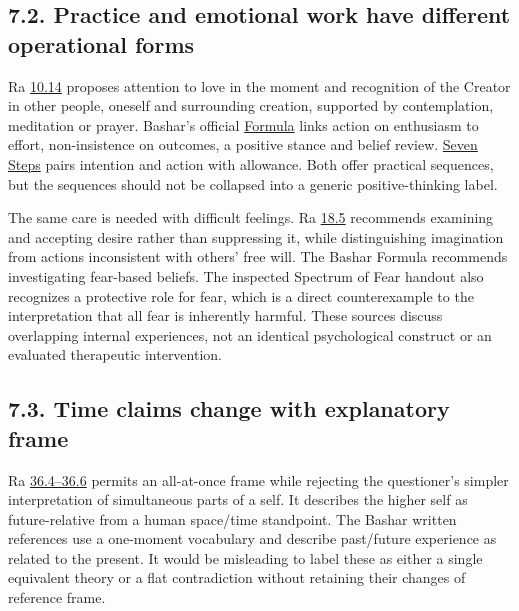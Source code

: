 \documentclass[
  11pt,
]{article}
\begin{document}
\FloatBarrier

\subsection{7.2. Practice and emotional work have different operational
forms}\label{practice-and-emotional-work-have-different-operational-forms}

Ra \href{https://www.lawofone.info/s/10\#10.14}{10.14} proposes
attention to love in the moment and recognition of the Creator in other
people, oneself and surrounding creation, supported by contemplation,
meditation or prayer. Bashar's official
\href{https://www.bashar.org/formula}{Formula} links action on
enthusiasm to effort, non-insistence on outcomes, a positive stance and
belief review. \href{https://www.bashar.org/sevensteps}{Seven Steps}
pairs intention and action with allowance. Both offer practical
sequences, but the sequences should not be collapsed into a generic
positive-thinking label.

The same care is needed with difficult feelings. Ra
\href{https://www.lawofone.info/s/18\#18.5}{18.5} recommends examining
and accepting desire rather than suppressing it, while distinguishing
imagination from actions inconsistent with others' free will. The Bashar
Formula recommends investigating fear-based beliefs. The inspected
Spectrum of Fear handout also recognizes a protective role for fear,
which is a direct counterexample to the interpretation that all fear is
inherently harmful. These sources discuss overlapping internal
experiences, not an identical psychological construct or an evaluated
therapeutic intervention.

\FloatBarrier

\subsection{7.3. Time claims change with explanatory
frame}\label{time-claims-change-with-explanatory-frame}

Ra \href{https://www.lawofone.info/s/36\#36.4}{36.4--36.6} permits an
all-at-once frame while rejecting the questioner's simpler
interpretation of simultaneous parts of a self. It describes the higher
self as future-relative from a human space/time standpoint. The Bashar
written references use a one-moment vocabulary and describe past/future
experience as related to the present. It would be misleading to label
these as either a single equivalent theory or a flat contradiction
without retaining their changes of reference frame.
\end{document}
